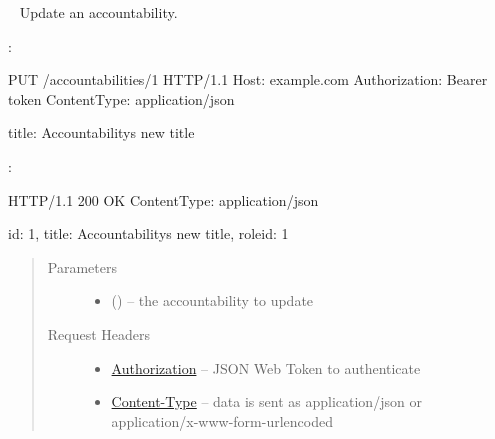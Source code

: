 \documentclass[letterpaper,10pt,english]{sphinxmanual}
\begin{document}
\begin{fulllineitems}
\label{\detokenize{resources/accountability:put--accountabilities-(accountability_id)}}~
Update an accountability.

:

\begin{sphinxVerbatim}[commandchars=\\\{\}]
PUT /accountabilities/1 HTTP/1.1
Host: example.com
Authorization: Bearer \PYGZlt{}token\PYGZgt{}
Content\PYGZhy{}Type: application/json

\PYGZob{}
    \PYGZsq{}title\PYGZsq{}: \PYGZsq{}Accountability\PYGZsq{}s new title\PYGZsq{}
\PYGZcb{}
\end{sphinxVerbatim}

:

\begin{sphinxVerbatim}[commandchars=\\\{\}]
HTTP/1.1 200 OK
Content\PYGZhy{}Type: application/json

\PYGZob{}
    \PYGZsq{}id\PYGZsq{}: 1,
    \PYGZsq{}title\PYGZsq{}: \PYGZsq{}Accountability\PYGZsq{}s new title\PYGZsq{},
    \PYGZsq{}role\PYGZus{}id\PYGZsq{}: 1
\PYGZcb{}
\end{sphinxVerbatim}
\begin{quote}\begin{description}
\item[{Parameters}] \leavevmode\begin{itemize}
\item {} 
 () -- the accountability to update

\end{itemize}

\item[{Request Headers}] \leavevmode\begin{itemize}
\item {} 
\href{http://tools.ietf.org/html/rfc7235\#section-4.2}{Authorization} -- JSON Web Token to authenticate

\item {} 
\href{http://tools.ietf.org/html/rfc7231\#section-3.1.1.5}{Content-Type} -- data is sent as application/json or
application/x-www-form-urlencoded

\end{itemize}


\end{description}
\end{quote}
\end{fulllineitems}
\end{document}

